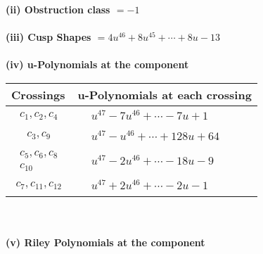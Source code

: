 \documentclass[1p]{elsarticle_modified}
\theoremstyle{definition}
\begin{document}
\flushleft \textbf{(ii) Obstruction class $= -1$}\\~\\
\flushleft \textbf{(iii) Cusp Shapes $= 4 u^{46}+8 u^{45}+\cdots+8 u-13$}\\~\\
\newpage\renewcommand{\arraystretch}{1}
\flushleft \textbf{(iv) u-Polynomials at the component}\newline \\
\begin{tabular}{m{50pt}|m{274pt}}
Crossings & \hspace{64pt}u-Polynomials at each crossing \\
\hline $$\begin{aligned}c_{1},c_{2},c_{4}\end{aligned}$$&$\begin{aligned}
&u^{47}-7 u^{46}+\cdots-7 u+1
\end{aligned}$\\
\hline $$\begin{aligned}c_{3},c_{9}\end{aligned}$$&$\begin{aligned}
&u^{47}- u^{46}+\cdots+128 u+64
\end{aligned}$\\
\hline $$\begin{aligned}c_{5},c_{6},c_{8}\\c_{10}\end{aligned}$$&$\begin{aligned}
&u^{47}-2 u^{46}+\cdots-18 u-9
\end{aligned}$\\
\hline $$\begin{aligned}c_{7},c_{11},c_{12}\end{aligned}$$&$\begin{aligned}
&u^{47}+2 u^{46}+\cdots-2 u-1
\end{aligned}$\\
\hline
\end{tabular}\\~\\
\newpage\renewcommand{\arraystretch}{1}
\flushleft \textbf{(v) Riley Polynomials at the component}\newline \\
\end{document}
